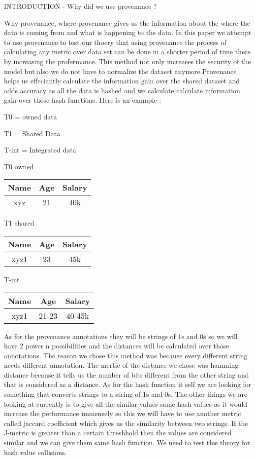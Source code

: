\documentclass{article}
\begin{document}
INTRODUCTION - Why did we use provenance ?

Why provenance, where provenance gives us the information about the where the data is coming from and what is happening to the data. In this paper we attempt to use provenance to test our thoery that using provenance the process of calculating any metric over data set can be done in a shorter period of time there by increasing the profermance. This method not only increases the security of the model but also we do not have to normalize the dataset anymore.Provenance helps us effeciantly calculate the information gain over the shared dataset and adds accuracy as all the data is hashed and we calculate calculate information gain over those hash functions.
Here is an example :

T0 = owned data 

T1 = Shared Data 

T-int = Integrated data

T0 owned

\begin{tabular}{ |c|c|c| } 
 \hline
 Name & Age & Salary \\ 
\hline
 xyz & 21 & 40k \\ 
 \hline
\end{tabular}

T1 shared 

\begin{tabular}{ |c|c|c| } 
 \hline
 Name & Age & Salary \\ 
\hline
 xyz1 & 23 & 45k \\ 
 \hline
\end{tabular}

T-int

\begin{tabular}{ |c|c|c| } 
 \hline
 Name & Age & Salary \\ 
\hline
 xyz1 & 21-23 & 40-45k \\ 
 \hline
\end{tabular}

As for the provenance annotations they will be strings of 1s and 0s so we will have 2 power n possibilities and the distances will be  calculated over those annotations. The reason we chose this method was because every different string needs different annotation. The mertic of the distance we chose was hamming distance because it tells us the number of bits different from the other string and that is considered as a distance.
As for the hash function it self we are looking for something that converts strings to a string of 1s and 0s.
The other things we are looking at currently is to give all the similar values same hash values as it would increase the performance immensely so this we will have to use another metric called jaccard coefficient which gives us the similarity between two strings. If the J-metric is greater than a certain threshhold then the values are considered similar and we can give them same hash function. We need to test this theory for hash value collisions.
\end{document}
